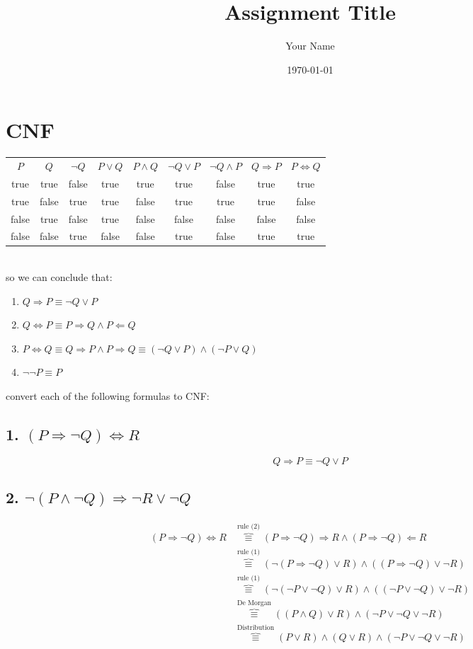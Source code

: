 \documentclass{article}
\title{Assignment Title}
\author{Your Name}
\date{\today}
\begin{document}
\maketitle

\section{CNF}
\begin{tabular}{ccccccccc}
    $P$ & $Q$  & $\neg Q$ & $P \lor Q$ & $P \land Q$ & $\neg Q \lor P$ & $\neg Q \land P$ & $Q \Rightarrow P$ & $P \iff Q$\\
    true&true&false&true&true&true&false&true&true\\
    true&false&true&true&false&true&true&true&false\\
    false&true&false&true&false&false&false&false&false\\
    false&false&true&false&false&true&false&true&true\\
\end{tabular}\\
so we can conclude that:
\begin{enumerate}
    \item $Q \Rightarrow P \equiv \neg Q \lor P$
    \item $Q \iff P \equiv P \Rightarrow Q \land P \Leftarrow Q $
    \item $P \iff Q \equiv Q \Rightarrow P \land P \Rightarrow Q  \equiv (\neg Q \lor P) \land (\neg P \lor Q)$
    \item $\neg \neg P \equiv P$
\end{enumerate}
convert each of the following formulas to CNF:
\subsection{1. $(P \Rightarrow \neg Q) \iff R$}
\begin{equation}
    Q \Rightarrow P \equiv \neg Q \lor P
\end{equation}
\subsection{2. $\neg (P \land \neg Q) \Rightarrow \neg R \lor \neg Q$}
\begin{equation}
    \begin{aligned}
        (P \Rightarrow \neg Q) \iff R &\overbrace{\equiv}^{\text{rule (2)}} (P \Rightarrow \neg Q) \Rightarrow R \land (P \Rightarrow \neg Q) \Leftarrow R\\
        &\overbrace{\equiv}^{\text{rule (1)}} (\neg (P \Rightarrow \neg Q) \lor R ) \land (( P \Rightarrow \neg Q) \lor \neg R)\\
        &\overbrace{\equiv}^{\text{rule (1)}} (\neg (\neg P \lor \neg Q) \lor R ) \land ((\neg P \lor \neg Q) \lor \neg R)\\
        &\overbrace{\equiv}^{\text{De Morgan}} ((  P \land  Q) \lor R) \land (\neg P \lor \neg Q \lor \neg R)\\
        &\overbrace{\equiv}^{\text{Distribution}} ( P \lor R) \land (  Q \lor R) \land  (\neg P \lor \neg Q \lor \neg R)
    \end{aligned}
\end{equation}
\end{document}
